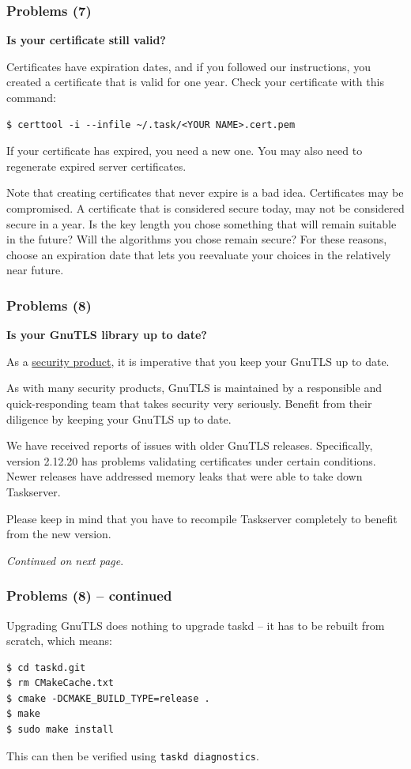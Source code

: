 \documentclass[t,handout]{beamer}
\begin{document}
\begin{frame}[fragile]\frametitle{Problems (7)}
    \vfill
    \textbf{Is your certificate still valid?}

    Certificates have expiration dates, and if you followed our instructions, you created a certificate that is valid for one year.  Check your certificate with this command:

    \begin{lstlisting}
$ certtool -i --infile ~/.task/<YOUR NAME>.cert.pem\end{lstlisting}

    If your certificate has expired, you need a new one.  You may also need to regenerate expired server certificates.

    Note that creating certificates that never expire is a bad idea. Certificates may be compromised. A certificate that is considered secure today, may not be considered secure in a year. Is the key length you chose something that will remain suitable in the future? Will the algorithms you          chose remain secure? For these reasons, choose an expiration date that lets you reevaluate your choices in the relatively near future.
\end{frame}

\begin{frame}[fragile]\frametitle{Problems (8)}\label{gnutlsproblem}
    \vfill
    \textbf{Is your GnuTLS library up to date?}

    As a \href{http://gnutls.org/security.html}{security product}, it is imperative that you keep your GnuTLS up to date.

    As with many security products, GnuTLS is maintained by a responsible and quick-responding team that takes security very seriously.  Benefit from their diligence by keeping your GnuTLS up to date.

    We have received reports of issues with older GnuTLS releases. Specifically, version 2.12.20 has problems validating certificates under certain conditions. Newer releases have addressed memory leaks that were able to take down Taskserver.

    Please keep in mind that you have to recompile Taskserver completely to benefit from the new version.

    \emph{Continued on next page}.
\end{frame}

\begin{frame}[fragile]\frametitle{Problems (8) -- continued}
    \vfill
    Upgrading GnuTLS does nothing to upgrade taskd -- it has to be rebuilt from scratch, which means:

    \begin{lstlisting}
$ cd taskd.git
$ rm CMakeCache.txt
$ cmake -DCMAKE_BUILD_TYPE=release .
$ make
$ sudo make install\end{lstlisting}

    This can then be verified using \verb+taskd diagnostics+.
\end{frame}
\end{document}
